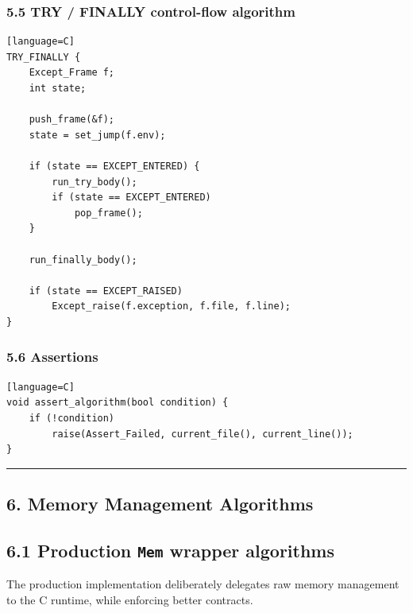 \documentclass[11pt]{article}
\begin{document}
\subsubsection{5.5 TRY / FINALLY control-flow algorithm}\label{try-finally-control-flow-algorithm}

\begin{verbatim}[language=C]
TRY_FINALLY {
    Except_Frame f;
    int state;

    push_frame(&f);
    state = set_jump(f.env);

    if (state == EXCEPT_ENTERED) {
        run_try_body();
        if (state == EXCEPT_ENTERED)
            pop_frame();
    }

    run_finally_body();

    if (state == EXCEPT_RAISED)
        Except_raise(f.exception, f.file, f.line);
}
\end{verbatim}

\subsubsection{5.6 Assertions}\label{assertions}

\begin{verbatim}[language=C]
void assert_algorithm(bool condition) {
    if (!condition)
        raise(Assert_Failed, current_file(), current_line());
}
\end{verbatim}

\begin{center}\rule{0.5\linewidth}{0.5pt}\end{center}

\subsection{6. Memory Management Algorithms}\label{memory-management-algorithms}

\subsection{\texorpdfstring{6.1 Production \texttt{Mem} wrapper algorithms}{6.1 Production Mem wrapper algorithms}}\label{production-mem-wrapper-algorithms}

The production implementation deliberately delegates raw memory management to the C runtime, while enforcing better contracts.
\end{document}
